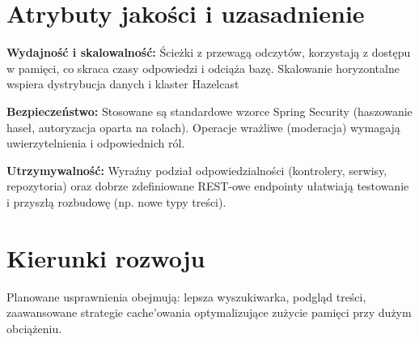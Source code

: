 \section*{Atrybuty jakości i uzasadnienie}
\textbf{Wydajność i skalowalność:} Ścieżki z przewagą odczytów, korzystają z dostępu w pamięci, co skraca czasy odpowiedzi i odciąża bazę. Skalowanie horyzontalne wspiera dystrybucja danych i klaster Hazelcast

\noindent\textbf{Bezpieczeństwo:} Stosowane są standardowe wzorce Spring Security (haszowanie haseł, autoryzacja oparta na rolach). Operacje wrażliwe (moderacja) wymagają uwierzytelnienia i odpowiednich ról.

\noindent\textbf{Utrzymywalność:} Wyraźny podział odpowiedzialności (kontrolery, serwisy, repozytoria) oraz dobrze zdefiniowane REST-owe endpointy ułatwiają testowanie i przyszłą rozbudowę (np. nowe typy treści).

\section*{Kierunki rozwoju}
Planowane usprawnienia obejmują: lepsza wyszukiwarka, podgląd treści, zaawansowane strategie cache'owania optymalizujące zużycie pamięci przy dużym obciążeniu.


